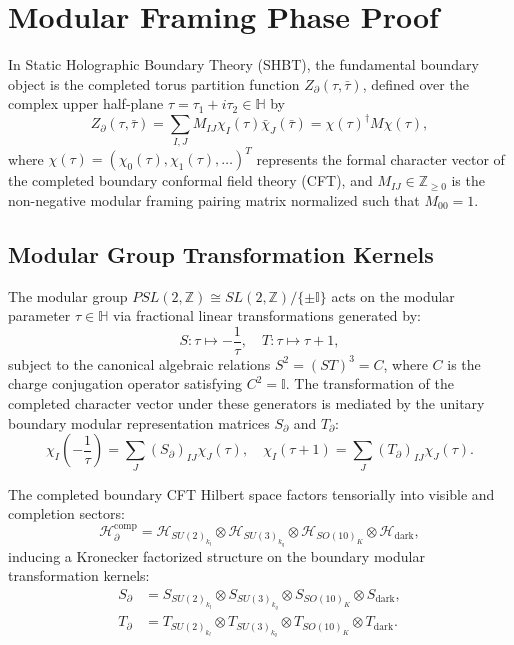 \documentclass[11pt,letterpaper]{article}
\theoremstyle{plain}
\begin{document}
\section{Modular Framing Phase Proof}
\label{sec:modular_framing_proof}
\label{app:center-directed-modular-framing}

In Static Holographic Boundary Theory (SHBT), the fundamental boundary object is the completed torus partition function $Z_{\partial}(\tau, \bar{\tau})$, defined over the complex upper half-plane $\tau = \tau_1 + i \tau_2 \in \mathbb{H}$ by
\begin{equation}
Z_{\partial}(\tau, \bar{\tau}) = \sum_{I, J} M_{IJ} \chi_I(\tau) \bar{\chi}_J(\bar{\tau}) = \chi(\tau)^\dagger M \chi(\tau),
\end{equation}
where $\chi(\tau) = (\chi_0(\tau), \chi_1(\tau), \dots)^T$ represents the formal character vector of the completed boundary conformal field theory (CFT), and $M_{IJ} \in \mathbb{Z}_{\ge 0}$ is the non-negative modular framing pairing matrix normalized such that $M_{00} = 1$.

\subsection{Modular Group Transformation Kernels}
The modular group $PSL(2,\mathbb{Z}) \cong SL(2,\mathbb{Z}) / \{\pm \mathbb{I}\}$ acts on the modular parameter $\tau \in \mathbb{H}$ via fractional linear transformations generated by:
\begin{equation}
S: \tau \mapsto -\frac{1}{\tau}, \quad T: \tau \mapsto \tau + 1,
\end{equation}
subject to the canonical algebraic relations $S^2 = (ST)^3 = C$, where $C$ is the charge conjugation operator satisfying $C^2 = \mathbb{I}$. The transformation of the completed character vector under these generators is mediated by the unitary boundary modular representation matrices $S_{\partial}$ and $T_{\partial}$:
\begin{equation}
\chi_I\left(-\frac{1}{\tau}\right) = \sum_{J} (S_{\partial})_{IJ} \chi_J(\tau), \quad \chi_I(\tau + 1) = \sum_{J} (T_{\partial})_{IJ} \chi_J(\tau).
\end{equation}

The completed boundary CFT Hilbert space factors tensorially into visible and completion sectors:
\begin{equation}
\mathcal{H}_{\partial}^{\text{comp}} = \mathcal{H}_{SU(2)_{k_l}} \otimes \mathcal{H}_{SU(3)_{k_q}} \otimes \mathcal{H}_{SO(10)_K} \otimes \mathcal{H}_{\text{dark}},
\end{equation}
inducing a Kronecker factorized structure on the boundary modular transformation kernels:
\begin{align}
S_{\partial} &= S_{SU(2)_{k_l}} \otimes S_{SU(3)_{k_q}} \otimes S_{SO(10)_K} \otimes S_{\text{dark}}, \label{eq:S_tensor} \\
T_{\partial} &= T_{SU(2)_{k_l}} \otimes T_{SU(3)_{k_q}} \otimes T_{SO(10)_K} \otimes T_{\text{dark}}. \label{eq:T_tensor}
\end{align}
\end{document}
